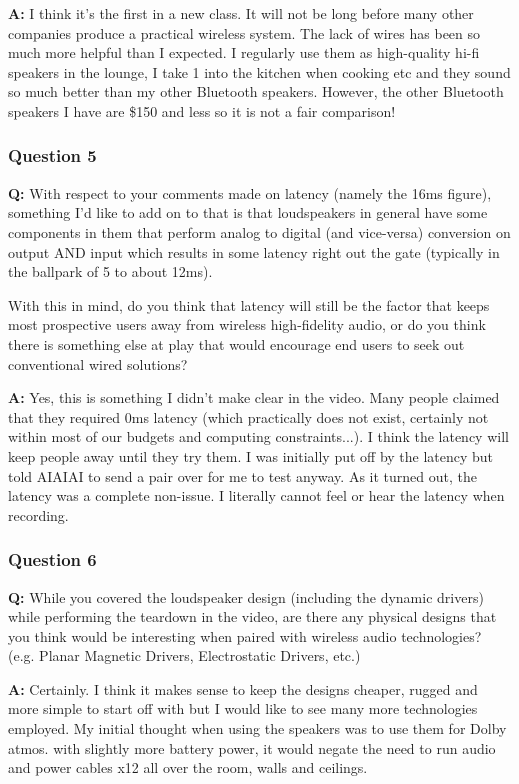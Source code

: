 \documentclass[conference]{IEEEtran}
\begin{document}
\textbf{A:}  I think it's the first in a new class. It will not be long before many other
companies produce a practical wireless system. The lack of wires has been so much more
helpful than I expected. I regularly use them as high-quality hi-fi speakers in the lounge, I
take 1 into the kitchen when cooking etc and they sound so much better than my other
Bluetooth speakers. However, the other Bluetooth speakers I have are \$150 and less so it is
not a fair comparison!

\subsubsection*{Question 5}
\textbf{Q:} With respect to your comments made on latency (namely the 16ms figure), something
I'd like to add on to that is that loudspeakers in general have some components in them that
perform analog to digital (and vice-versa) conversion on output AND input which results in
some latency right out the gate (typically in the ballpark of 5 to about 12ms).

With this in mind, do you think that latency will still be the factor that keeps most
prospective users away from wireless high-fidelity audio, or do you think there is something
else at play that would encourage end users to seek out conventional wired solutions?

\textbf{A:} Yes, this is something I didn't make clear in the video. Many people claimed that
they required 0ms latency (which practically does not exist, certainly not within most of our
budgets and computing constraints...). I think the latency will keep people away until they
try them. I was initially put off by the latency but told AIAIAI to send a pair over for me
to test anyway. As it turned out, the latency was a complete non-issue. I literally cannot
feel or hear the latency when recording.

\subsubsection*{Question 6}
\textbf{Q:} While you covered the loudspeaker design (including the dynamic drivers) while
performing the teardown in the video, are there any physical designs that you think would be
interesting when paired with wireless audio technologies? (e.g. Planar Magnetic Drivers,
Electrostatic Drivers, etc.)

\textbf{A:} Certainly. I think it makes sense to keep the designs cheaper, rugged and more
simple to start off with but I would like to see many more technologies employed.
My initial thought when using the speakers was to use them for Dolby atmos. with slightly
more battery power, it would negate the need to run audio and power cables x12 all over the
room, walls and ceilings. \cite{wynne_interviewing_2023}
\end{document}
